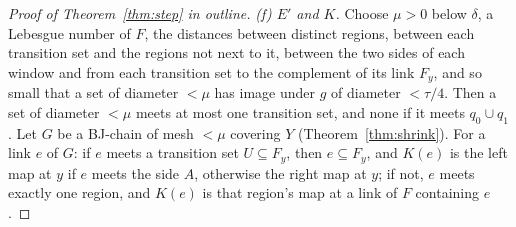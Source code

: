 \begin{proof}[Proof of Theorem~\ref{thm:step} in outline]
\emph{(f) $E'$ and $K$.} Choose $\mu>0$ below $\delta$, a Lebesgue number of $F$, the distances between distinct regions, between each transition set and the regions not next
to it, between the two sides of each window and from each transition set to the complement of its link $F_y$, and so small that a set of diameter $<\mu$ has image under $g$
of diameter $<\tau/4$. Then a set of diameter $<\mu$ meets at most one transition set, and none if it meets $q_0\cup q_1$. Let $G$ be a BJ-chain of mesh $<\mu$ covering $Y$
(Theorem~\ref{thm:shrink}). For a link $e$ of $G$: if $e$ meets a transition set $U\subseteq F_y$, then $e\subseteq F_y$, and $K(e)$ is the left map at $y$ if $e$ meets the side $A$,
otherwise the right map at $y$; if not, $e$ meets exactly one region, and $K(e)$ is that region's map at a link of $F$ containing $e$.


\end{proof}
